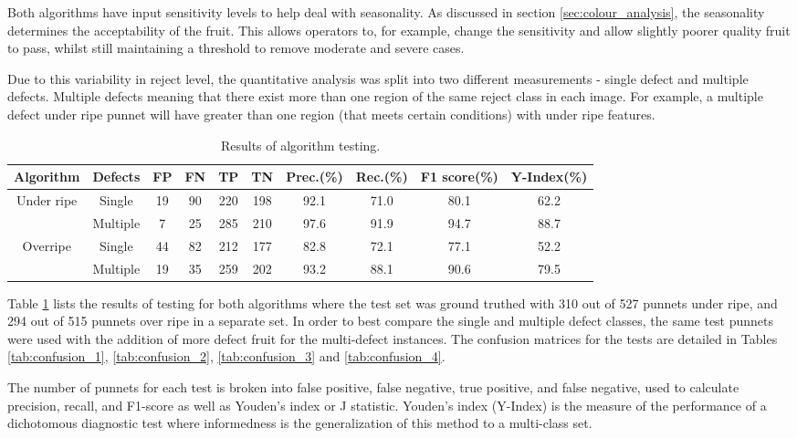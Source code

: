 \documentclass[fleqn,twoside,12pt]{report}
\begin{document}
Both algorithms have input sensitivity levels to help deal with seasonality. As discussed in section \ref{sec:colour_analysis}, the seasonality determines the acceptability of the fruit. This allows operators to, for example, change the sensitivity and allow slightly poorer quality fruit to pass, whilst still maintaining a threshold to remove moderate and severe cases.

Due to this variability in reject level, the quantitative analysis was split into two different measurements - single defect and multiple defects. Multiple defects meaning that there exist more than one region of the same reject class in each image. For example, a multiple defect under ripe punnet will have greater than one region (that meets certain conditions) with under ripe features.

\begin{table}[h]
	\centering
	\caption{Results of algorithm testing.}
	\label{tab:algo_test}
	\begin{tabular}{@{}c*{8}{c}c@{}}
		\toprule
		Algorithm & Defects & FP  & FN  & TP  & TN  & Prec.(\%) & Rec.(\%) & F1 score(\%) & Y-Index(\%)\\ 
		\midrule
		Under ripe   & Single   & 19 & 90 & 220 & 198 & 92.1 & 71.0 & 80.1 & 62.2 \\[6pt] 
		& Multiple & 7  & 25 & 285 & 210 & 97.6 & 91.9 & 94.7 & 88.7 \\[6pt]
		Overripe    & Single   & 44 & 82 & 212 & 177 & 82.8 & 72.1 & 77.1 & 52.2 \\[6pt]
		& Multiple & 19 & 35 & 259 & 202 & 93.2 & 88.1 & 90.6 & 79.5 \\[6pt]	 
		\bottomrule
	\end{tabular}
\end{table}


Table \ref{tab:algo_test} lists the results of testing for both algorithms where the test set was ground truthed with 310 out of 527 punnets under ripe, and 294 out of 515 punnets over ripe in a separate set. In order to best compare the single and multiple defect classes, the same test punnets were used with the addition of more defect fruit for the multi-defect instances. The confusion matrices for the tests are detailed in Tables \ref{tab:confusion_1},  \ref{tab:confusion_2}, \ref{tab:confusion_3} and \ref{tab:confusion_4}.

The number of punnets for each test is broken into false positive, false negative, true positive, and false negative, used to calculate precision, recall, and F1-score as well as Youden's index or J statistic. Youden's index (Y-Index) is the measure of the performance of a dichotomous diagnostic test where informedness is the generalization of this method to a multi-class set.
\end{document}
